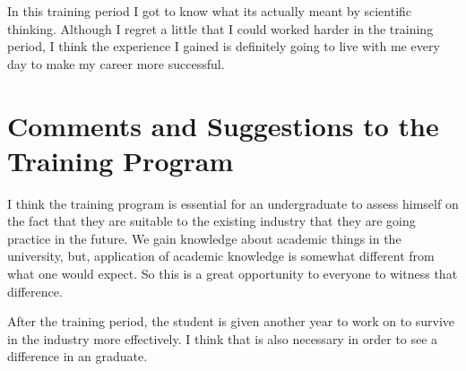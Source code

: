 In this training period I got to know what its actually meant by scientific thinking. Although I regret a little that I could worked harder in the training period, I think the experience I gained is definitely going to live with me every day to make my career more successful.

\section{Comments and Suggestions to the Training Program}
I think the training program is essential for an undergraduate to assess himself on the fact that they are suitable to the existing industry that they are going practice in the future. We gain knowledge about academic things in the university, but, application of academic knowledge is somewhat different from what one would expect. So this is a great opportunity to everyone to witness that difference.

After the training period, the student is given another year to work on to survive in the industry more effectively. I think that is also necessary in order to see a difference in an graduate.